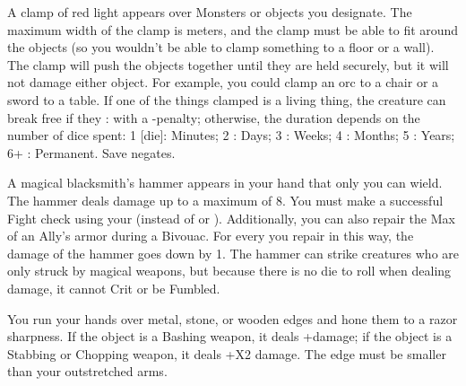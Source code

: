 {\LITURGY [
  Name= Clamp,
  Link= vulcan-liturgy-clamp,
  Paradigm= Force ,
  Save=  Y (negates) ,
  Duration= varies ,
  Counter=  n/a  ,
  Keywords= Contested ,
  Target=   Nearby object or Monster
]



A clamp of red light appears over \DICE Monsters or objects you designate. The maximum width of the clamp is \DICE meters, and the clamp must be able to fit around the objects (so you wouldn't be able to clamp something to a floor or a wall).  The clamp will push the objects together until they are held securely, but it will not damage either object.  For example, you could clamp an orc to a chair or a sword to a table.  If one of the things clamped is a living thing, the creature can break free if they \RB : \VIG with a -\DICE penalty; otherwise, the duration depends on the number of dice spent:  1 [die]: Minutes; 2 \DICE: Days; 3 \DICE: Weeks; 4 \DICE: Months; 5 \DICE: Years; 6+ \DICE: Permanent.  Save negates.

\LITURGY [
  Name= Hammer of the Forge,
  Link=vulcan-liturgy-hammer,
  Paradigm= Force ,
  Save=  N ,
  Duration= Session ,
  Counter=  n/a  ,
  Keywords= None ,
  Target=   Self
]



A magical blacksmith's hammer appears in your hand that only you can wield.  The hammer deals \DICE damage up to a maximum of 8. You must make a successful Fight check using your \FOC (instead of \VIG or \DEX).   Additionally, you can also repair the Max \UD of an Ally's armor during a Bivouac.  For every \DCUP you repair in this way, the damage of the hammer goes down by 1.  The hammer can strike creatures who are only struck by magical weapons, but because there is no die to roll when dealing damage, it cannot Crit or be Fumbled. 

\LITURGY [
  Name= Hone,
  Link=vulcan-liturgy-hone,
  Paradigm= Force ,
  Save=  0 ,
  Duration= Combat or \SUMDICE Minutes ,
  Counter=  n/a  ,
  Keywords= Splittable ,
  Target=   Close objects
]



You run your hands over \DICE metal, stone, or wooden edges and hone them to a razor sharpness. If the object is a Bashing weapon, it deals +\DICE damage; if the object is a Stabbing or Chopping weapon, it deals +\DICE X2 damage. The edge must be smaller than your outstretched arms.

\LITURGY [
  Name= Vulcan Plate,
  Link=vulcan-liturgy-plate,
  Paradigm= Force ,
  Save=  N ,
  Duration= Session ,
  Counter=  n/a  ,
  Keywords= None ,
  Target=   Self
]



}
